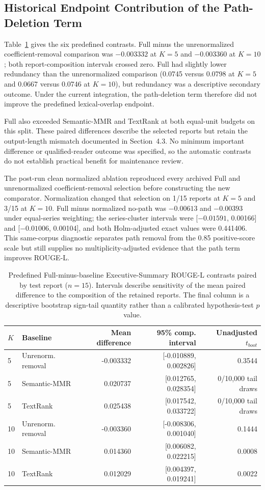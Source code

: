\documentclass[applsci,article,submit,moreauthors]{Definitions/mdpi}
\begin{document}
\subsection{Historical Endpoint Contribution of the Path-Deletion Term}

Table~\ref{tab:contrasts} gives the six predefined contrasts. Full minus the unrenormalized coefficient-removal comparison was $-0.003332$ at $K=5$ and $-0.003360$ at $K=10$; both report-composition intervals crossed zero. Full had slightly lower redundancy than the unrenormalized comparison (0.0745 versus 0.0798 at $K=5$ and 0.0667 versus 0.0746 at $K=10$), but redundancy was a descriptive secondary outcome. Under the current integration, the path-deletion term therefore did not improve the predefined lexical-overlap endpoint.

Full also exceeded Semantic-MMR and TextRank at both equal-unit budgets on this split. These paired differences describe the selected reports but retain the output-length mismatch documented in Section~4.3. No minimum important difference or qualified-reader outcome was specified, so the automatic contrasts do not establish practical benefit for maintenance review.

The post-run clean normalized ablation reproduced every archived Full and unrenormalized coefficient-removal selection before constructing the new comparator. Normalization changed that selection on 1/15 reports at $K=5$ and 3/15 at $K=10$. Full minus normalized no-path was $-0.00613$ and $-0.00393$ under equal-series weighting; the series-cluster intervals were [$-0.01591$, 0.00166] and [$-0.01006$, 0.00104], and both Holm-adjusted exact values were 0.441406. This same-corpus diagnostic separates path removal from the 0.85 positive-score scale but still supplies no multiplicity-adjusted evidence that the path term improves ROUGE-L.

\begin{table}[H]
\caption{Predefined Full-minus-baseline Executive-Summary ROUGE-L contrasts paired by test report ($n=15$). Intervals describe sensitivity of the mean paired difference to the composition of the retained reports. The final column is a descriptive bootstrap sign-tail quantity rather than a calibrated hypothesis-test $p$ value.}
\label{tab:contrasts}\centering\small
\begin{tabular}{llrrr}
\toprule
$K$ & Baseline & Mean difference & 95\% comp. interval & Unadjusted $t_{boot}$\\
\midrule
5 & Unrenorm. removal & -0.003332 & [-0.010889, 0.002826] & 0.3544\\
5 & Semantic-MMR & 0.020737 & [0.012765, 0.028354] & 0/10,000 tail draws\\
5 & TextRank & 0.025438 & [0.017542, 0.033722] & 0/10,000 tail draws\\
10 & Unrenorm. removal & -0.003360 & [-0.008306, 0.001040] & 0.1444\\
10 & Semantic-MMR & 0.014360 & [0.006082, 0.022215] & 0.0008\\
10 & TextRank & 0.012029 & [0.004397, 0.019241] & 0.0022\\
\bottomrule
\end{tabular}
\end{table}
\end{document}
